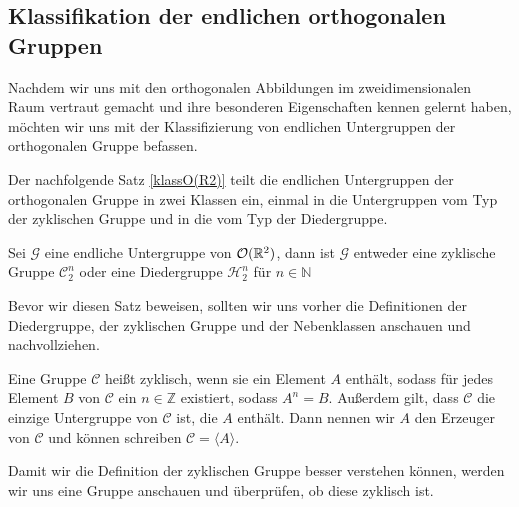 \subsection{Klassifikation der endlichen orthogonalen Gruppen}
Nachdem wir uns mit den orthogonalen Abbildungen im zweidimensionalen Raum vertraut gemacht und ihre besonderen Eigenschaften kennen gelernt haben, möchten wir uns mit der Klassifizierung von endlichen Untergruppen der orthogonalen Gruppe befassen. 

Der nachfolgende Satz \ref{klassO(R2)} teilt die endlichen Untergruppen der orthogonalen Gruppe in zwei Klassen ein, einmal in die Untergruppen vom Typ der zyklischen Gruppe und in die vom Typ der Diedergruppe.
\begin{theorem}\label{klassO(R2)}
	Sei $\mathcal{G}$ eine endliche Untergruppe von ${\mathcal{O}(\mathbb{R}^2)}$, dann ist $\mathcal{G}$ entweder eine zyklische Gruppe $\mathcal{C}^n_2$ oder eine Diedergruppe $\mathcal{H}^n_2$ für $n \in \mathbb{N}$
\end{theorem}
Bevor wir diesen Satz beweisen, sollten wir uns vorher die Definitionen der Diedergruppe, der zyklischen Gruppe und der Nebenklassen anschauen und nachvollziehen.
\begin{defi}
	Eine Gruppe $\mathcal{C}$ heißt zyklisch, wenn sie ein Element $A$ enthält, sodass für jedes Element $B$ von $\mathcal{C}$ ein $n \in \mathbb{Z}$ existiert, sodass $A^n = B$. Außerdem gilt, dass $\mathcal{C}$ die einzige Untergruppe von $\mathcal{C}$ ist, die $A$ enthält. Dann nennen wir $A$ den Erzeuger von $\mathcal{C}$ und können schreiben $\mathcal{C} = \langle A \rangle$.
\end{defi}
Damit wir die Definition der zyklischen Gruppe besser verstehen können, werden wir uns eine Gruppe anschauen und überprüfen, ob diese zyklisch ist. 

